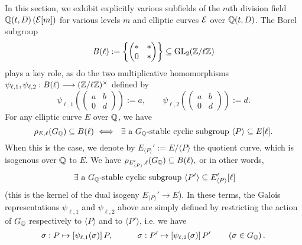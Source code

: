 In this section, we exhibit explicitly various subfields of the $m$th division field $\mathbb{Q}(t,D)\left( \mathcal{E}[m] \right)$ for various levels $m$ and elliptic curves $\mathcal{E}$ over $\mathbb{Q}(t,D)$.  The Borel subgroup
\[
B(\ell) := \left\{ \begin{pmatrix} * & * \\ 0 & * \end{pmatrix} \right\} \subseteq \operatorname{GL}_2(\mathbb{Z}/\ell\mathbb{Z})
\]
plays a key role, as do the two multiplicative homomorphisms $\psi_{\ell,1}, \psi_{\ell,2} : B(\ell) \longrightarrow (\mathbb{Z}/\ell\mathbb{Z})^\times$ defined by
\begin{equation} \label{generaldefinitionofpsisubp}
\psi_{\ell,1}\left( \begin{pmatrix} a & b \\ 0 & d \end{pmatrix} \right) := a, \quad\quad \psi_{\ell,2}\left( \begin{pmatrix} a & b \\ 0 & d \end{pmatrix} \right) := d.
\end{equation}
For any elliptic curve $E$ over $\mathbb{Q}$, we have
\begin{equation} \label{interpretationofwhenGaloismapsintoBorel}
\rho_{E,\ell}(G_{\mathbb{Q}}) \subseteq B(\ell) \; \Longleftrightarrow \; \text{ $\exists$ a $G_{\mathbb{Q}}$-stable cyclic subgroup } \langle P \rangle \subseteq E[\ell].
\end{equation}
When this is the case, we denote by $E_{\langle P \rangle}' := E / \langle P \rangle$ the quotient curve, which is isogenous over $\mathbb{Q}$ to $E$.  We have
$
\rho_{E_{\langle P \rangle}',\ell}(G_{\mathbb{Q}}) \subseteq B(\ell),
$
or in other words, 
\begin{equation} \label{existenceofPprime}
\text{ $\exists$ a $G_{\mathbb{Q}}$-stable cyclic subgroup } \langle P' \rangle \subseteq E_{\langle P \rangle}'[\ell]
\end{equation}
(this is the kernel of the dual isogeny $E_{\langle P \rangle}' \rightarrow E$).  In these terms, the Galois representations $\psi_{\ell,1}$ and $\psi_{\ell,2}$ above are simply defined by restricting the action of $G_{\mathbb{Q}}$ respectively to $\langle P \rangle$ and to $\langle P' \rangle$, i.e. we have
\begin{equation} \label{psisubellsactingonPandPprime}
\sigma : P \mapsto \left[ \psi_{\ell,1}(\sigma) \right] P, \quad\quad\quad \sigma : P' \mapsto \left[ \psi_{\ell,2}(\sigma) \right] P' \quad\quad \left( \sigma \in G_{\mathbb{Q}} \right).
\end{equation}
